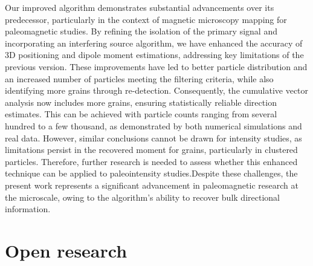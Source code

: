 Our improved algorithm demonstrates substantial advancements over its predecessor, particularly in the context of magnetic microscopy mapping for paleomagnetic studies. By refining the isolation of the primary signal and incorporating an interfering source algorithm, we have enhanced the accuracy of 3D positioning and dipole moment estimations, addressing key limitations of the previous version. These improvements have led to better particle distribution and an increased number of particles meeting the filtering criteria, while also identifying more grains through re-detection. Consequently, the cumulative vector analysis now includes more grains, ensuring statistically reliable direction estimates. This can be achieved with particle counts ranging from several hundred to a few thousand, as demonstrated by both numerical simulations and real data. However, similar conclusions cannot be drawn for intensity studies, as limitations persist in the recovered moment for grains, particularly in clustered particles. Therefore, further research is needed to assess whether this enhanced technique can be applied to paleointensity studies.Despite these challenges, the present work represents a significant advancement in paleomagnetic research at the microscale, owing to the algorithm's ability to recover bulk directional information.



\section{Open research}





